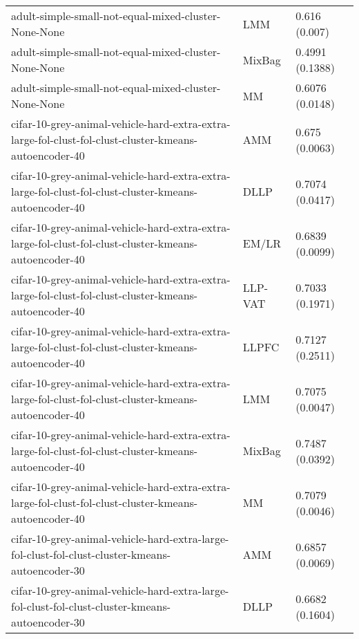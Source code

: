 \begin{longtable}{lll}
                                                         adult-simple-small-not-equal-mixed-cluster-None-None &       LMM &                         0.616 (0.007) \\
                                                         adult-simple-small-not-equal-mixed-cluster-None-None &    MixBag &                       0.4991 (0.1388) \\
                                                         adult-simple-small-not-equal-mixed-cluster-None-None &        MM &                       0.6076 (0.0148) \\
        cifar-10-grey-animal-vehicle-hard-extra-extra-large-fol-clust-fol-clust-cluster-kmeans-autoencoder-40 &       AMM &                        0.675 (0.0063) \\
        cifar-10-grey-animal-vehicle-hard-extra-extra-large-fol-clust-fol-clust-cluster-kmeans-autoencoder-40 &      DLLP &                       0.7074 (0.0417) \\
        cifar-10-grey-animal-vehicle-hard-extra-extra-large-fol-clust-fol-clust-cluster-kmeans-autoencoder-40 &     EM/LR &                       0.6839 (0.0099) \\
        cifar-10-grey-animal-vehicle-hard-extra-extra-large-fol-clust-fol-clust-cluster-kmeans-autoencoder-40 &   LLP-VAT &                       0.7033 (0.1971) \\
        cifar-10-grey-animal-vehicle-hard-extra-extra-large-fol-clust-fol-clust-cluster-kmeans-autoencoder-40 &     LLPFC &                       0.7127 (0.2511) \\
        cifar-10-grey-animal-vehicle-hard-extra-extra-large-fol-clust-fol-clust-cluster-kmeans-autoencoder-40 &       LMM &                       0.7075 (0.0047) \\
        cifar-10-grey-animal-vehicle-hard-extra-extra-large-fol-clust-fol-clust-cluster-kmeans-autoencoder-40 &    MixBag &                       0.7487 (0.0392) \\
        cifar-10-grey-animal-vehicle-hard-extra-extra-large-fol-clust-fol-clust-cluster-kmeans-autoencoder-40 &        MM &                       0.7079 (0.0046) \\
              cifar-10-grey-animal-vehicle-hard-extra-large-fol-clust-fol-clust-cluster-kmeans-autoencoder-30 &       AMM &                       0.6857 (0.0069) \\
              cifar-10-grey-animal-vehicle-hard-extra-large-fol-clust-fol-clust-cluster-kmeans-autoencoder-30 &      DLLP &                       0.6682 (0.1604) \\

\end{longtable}
